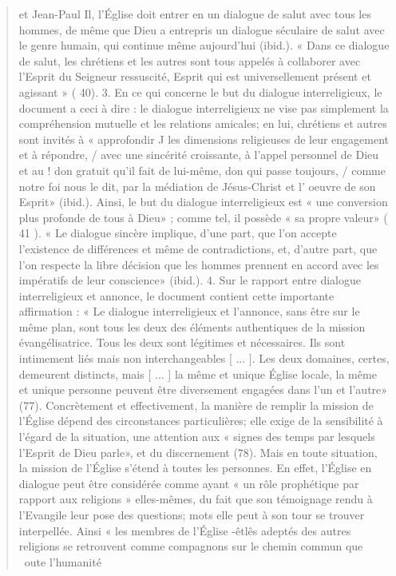 \begin{quote}
et Jean-Paul Il, l'Église doit entrer en un dialogue de salut
avec tous les hommes, de même que Dieu a entrepris un dialogue
séculaire de salut avec le genre humain, qui continue
même aujourd'hui (ibid.). « Dans ce dialogue de salut, les chrétiens
et les autres sont tous appelés à collaborer avec l'Esprit
du Seigneur ressuscité, Esprit qui est universellement présent
et agissant » ( 40).
3. En ce qui concerne le but du dialogue interreligieux, le
document a ceci à dire : le dialogue interreligieux ne vise pas
simplement la compréhension mutuelle et les relations amicales; en lui, chrétiens et autres sont invités à « approfondir J
les dimensions religieuses de leur engagement et à répondre, /
avec une sincérité croissante, à l'appel personnel de Dieu et au !
don gratuit qu'il fait de lui-même, don qui passe toujours, /
comme notre foi nous le dit, par la médiation de Jésus-Christ
et l' oeuvre de son Esprit» (ibid.). Ainsi, le but du dialogue
interreligieux est « une conversion plus profonde de tous à
Dieu» ; comme tel, il possède « sa propre valeur» ( 41 ). « Le
dialogue sincère implique, d'une part, que l'on accepte l'existence
de différences et même de contradictions, et, d'autre
part, que l'on respecte la libre décision que les hommes prennent
en accord avec les impératifs de leur conscience» (ibid.).
4. Sur le rapport entre dialogue interreligieux et annonce, le
document contient cette importante affirmation : « Le dialogue
interreligieux et l'annonce, sans être sur le même plan, sont
tous les deux des éléments authentiques de la mission évangélisatrice.
Tous les deux sont légitimes et nécessaires. Ils sont
intimement liés mais non interchangeables [ ... ]. Les deux
domaines, certes, demeurent distincts, mais [ ... ] la même et
unique Église locale, la même et unique personne peuvent être
diversement engagées dans l'un et l'autre» (77).
Concrètement et effectivement, la manière de remplir la
mission de l'Église dépend des circonstances particulières;
elle exige de la sensibilité à l'égard de la situation, une attention
aux « signes des temps par lesquels l'Esprit de Dieu parle»,
et du discernement (78). Mais en toute situation, la mission de
l'Église s'étend à toutes les personnes. En effet, l'Église en
dialogue peut être considérée comme ayant « un rôle prophétique
par rapport aux religions » elles-mêmes, du fait que son
témoignage rendu à l'Evangile leur pose des questions; mots
elle peut à son tour se trouver interpellée. Ainsi « les membres
de l'Église -êtlês adeptés des autres religions se retrouvent
comme compagnons sur le chemin commun que ~oute l'humanité

\end{quote}
